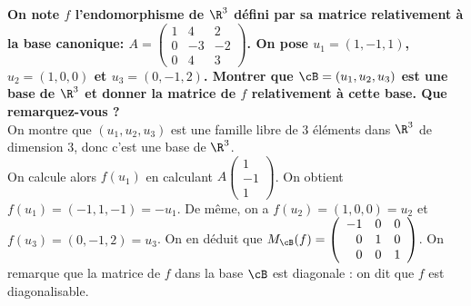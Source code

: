 \documentclass[a4paper, 11pt,reqno]{article}
\begin{document}
\begin{correction}  \;
	\textbf{On note $f$ l'endomorphisme de $\R^3$ d\'efini par sa matrice relativement \`a la base canonique:
		$A=\left(\begin{array}{rrr} 1&4&2\\ 0&-3&-2\\ 0&4&3 \end{array}\right)$. On pose $u_1=(1,-1,1)$, $u_2=(1,0,0)$ et $u_3=(0,-1,2)$. Montrer que $\cB=(u_1,u_2,u_3)$ est une base de $\R^3$ et donner la matrice de $f$ relativement \`a cette base. Que remarquez-vous ?}\\
	On montre que $(u_1,u_2,u_3)$ est une famille libre de $3$ \'el\'ements dans $\R^3$ de dimension $3$, donc c'est une base de $\R^3$.\\
	On calcule alors $f(u_1)$ en calculant $A \left(\begin{array}{r} 1\\ -1\\ 1 \end{array}\right)$. On obtient $f(u_1) =  (-1 , 1 , -1) = -u_1$. De m\^eme, on a $f(u_2) = (1,0,0) = u_2$ et $f(u_3) =  (0 , -1 , 2 ) = u_3$. On en d\'eduit que $M_{\cB}(f) =  \left(\begin{array}{rrr}
				-1 & 0 & 0 \\
				0  & 1 & 0 \\
				0  & 0 & 1
			\end{array} \right)$. On remarque que la matrice de $f$ dans la base $\cB$ est diagonale : on dit que $f$ est diagonalisable.
\end{correction}
\end{document}
